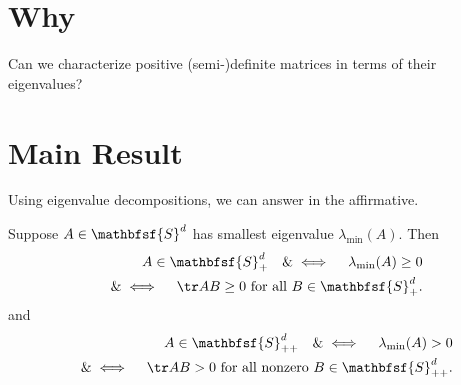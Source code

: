 
\section*{Why}

Can we characterize positive (semi-)definite matrices in terms of their eigenvalues?

\section*{Main Result}

Using eigenvalue decompositions, we can answer in the affirmative.

\begin{proposition}
Suppose $A \in \mathbfsf{S} ^d$ has smallest eigenvalue $\lambda _{\min}(A)$.
Then
  \[
\begin{aligned}
A \in \mathbfsf{S} _+^d \quad \&\iff \quad \lambda _{\min}(A) \geq 0 \\ \quad \&\iff \quad \tr AB \geq 0 \text{ for all } B \in \mathbfsf{S} _+^d.
\end{aligned}
  \]
and
  \[
\begin{aligned}
A \in \mathbfsf{S} _{++}^d \quad \&\iff \quad \lambda _{\min}(A) > 0 \\ \quad \&\iff \quad \tr AB > 0 \text{ for all nonzero } B \in \mathbfsf{S} _{++}^d.
\end{aligned}
  \]
\end{proposition}

\blankpage